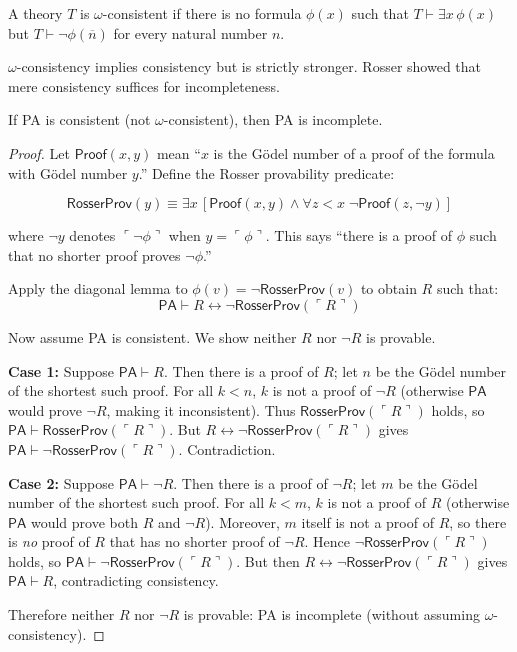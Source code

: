 \begin{definition}
A theory $T$ is $\omega$-consistent if there is no formula $\phi(x)$ such that $T \vdash \exists x\, \phi(x)$ but $T \vdash \neg \phi(\overline{n})$ for every natural number $n$.
\end{definition}

$\omega$-consistency implies consistency but is strictly stronger. Rosser showed that mere consistency suffices for incompleteness.

\begin{theorem}
If PA is consistent (not $\omega$-consistent), then PA is incomplete.
\end{theorem}

\begin{proof}[Proof]
Let $\mathsf{Proof}(x, y)$ mean ``$x$ is the Gödel number of a proof of the formula with Gödel number $y$.'' Define the Rosser provability predicate:

\[
\mathsf{RosserProv}(y) \equiv \exists x\, [\mathsf{Proof}(x, y) \land \forall z < x\; \neg \mathsf{Proof}(z, \neg y)]
\]

where $\neg y$ denotes $\ulcorner \neg \phi \urcorner$ when $y = \ulcorner \phi \urcorner$. This says ``there is a proof of $\phi$ such that no shorter proof proves $\neg \phi$.''

Apply the diagonal lemma to $\phi(v) = \neg \mathsf{RosserProv}(v)$ to obtain $R$ such that:
\[
\mathsf{PA} \vdash R \leftrightarrow \neg \mathsf{RosserProv}(\ulcorner R \urcorner)
\]

Now assume PA is consistent. We show neither $R$ nor $\neg R$ is provable.

\textbf{Case 1:} Suppose $\mathsf{PA} \vdash R$. Then there is a proof of $R$; let $n$ be the Gödel number of the shortest such proof. For all $k < n$, $k$ is not a proof of $\neg R$ (otherwise $\mathsf{PA}$ would prove $\neg R$, making it inconsistent). Thus $\mathsf{RosserProv}(\ulcorner R \urcorner)$ holds, so $\mathsf{PA} \vdash \mathsf{RosserProv}(\ulcorner R \urcorner)$. But $R \leftrightarrow \neg \mathsf{RosserProv}(\ulcorner R \urcorner)$ gives $\mathsf{PA} \vdash \neg \mathsf{RosserProv}(\ulcorner R \urcorner)$. Contradiction.

\textbf{Case 2:} Suppose $\mathsf{PA} \vdash \neg R$. Then there is a proof of $\neg R$; let $m$ be the Gödel number of the shortest such proof. For all $k < m$, $k$ is not a proof of $R$ (otherwise $\mathsf{PA}$ would prove both $R$ and $\neg R$). Moreover, $m$ itself is not a proof of $R$, so there is \emph{no} proof of $R$ that has no shorter proof of $\neg R$. Hence $\neg \mathsf{RosserProv}(\ulcorner R \urcorner)$ holds, so $\mathsf{PA} \vdash \neg \mathsf{RosserProv}(\ulcorner R \urcorner)$. But then $R \leftrightarrow \neg \mathsf{RosserProv}(\ulcorner R \urcorner)$ gives $\mathsf{PA} \vdash R$, contradicting consistency.

Therefore neither $R$ nor $\neg R$ is provable: PA is incomplete (without assuming $\omega$-consistency).
\end{proof}

